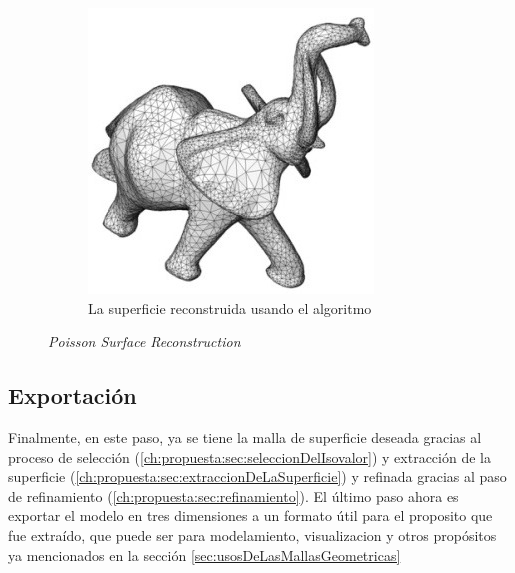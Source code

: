 \begin{figure}[h]
\begin{subfigure}[b]{0.45\textwidth}
		\includegraphics[width=\textwidth]{images/flujo/refinamiento_1_1.jpg}
		\caption{La superficie reconstruida usando el algoritmo}
		\label{f:flujoDeTrabajo:refinamiento_1_1}
	\end{subfigure}

	\caption{\emph{Poisson Surface Reconstruction}}
	\label{c:flujo:poissonSurfaceReconstruction}

\end{figure}



\subsection{Exportación}
\label{ch:propuesta:sec:exportacion}

Finalmente, en este paso, ya se tiene la malla de superficie deseada gracias al proceso de selección (\ref{ch:propuesta:sec:seleccionDelIsovalor}) y extracción de la superficie (\ref{ch:propuesta:sec:extraccionDeLaSuperficie}) y refinada gracias al paso de refinamiento (\ref{ch:propuesta:sec:refinamiento}). El último paso ahora es exportar el modelo en tres dimensiones a un formato útil para el proposito que fue extraído, que puede ser para modelamiento, visualizacion y otros propósitos ya mencionados en la sección \ref{sec:usosDeLasMallasGeometricas}